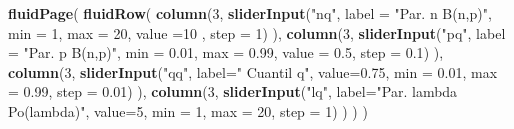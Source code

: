 \documentclass[]{book}
\newenvironment{Shaded}{\begin{snugshade}}{\end{snugshade}}
\newcommand{\DataTypeTok}[1]{\textcolor[rgb]{0.13,0.29,0.53}{#1}}
\newcommand{\DecValTok}[1]{\textcolor[rgb]{0.00,0.00,0.81}{#1}}
\newcommand{\FloatTok}[1]{\textcolor[rgb]{0.00,0.00,0.81}{#1}}
\newcommand{\KeywordTok}[1]{\textcolor[rgb]{0.13,0.29,0.53}{\textbf{#1}}}
\newcommand{\NormalTok}[1]{#1}
\newcommand{\StringTok}[1]{\textcolor[rgb]{0.31,0.60,0.02}{#1}}
\begin{document}
\begin{Shaded}
\begin{Highlighting}[]
\KeywordTok{fluidPage}\NormalTok{(}
\KeywordTok{fluidRow}\NormalTok{(}
  \KeywordTok{column}\NormalTok{(}\DecValTok{3}\NormalTok{,}
         \KeywordTok{sliderInput}\NormalTok{(}\StringTok{"nq"}\NormalTok{, }\DataTypeTok{label =} \StringTok{"Par. n B(n,p)"}\NormalTok{,}
              \DataTypeTok{min =} \DecValTok{1}\NormalTok{, }\DataTypeTok{max =} \DecValTok{20}\NormalTok{, }\DataTypeTok{value =}\DecValTok{10}\NormalTok{ , }\DataTypeTok{step =} \DecValTok{1}\NormalTok{)}
\NormalTok{         ),}
  \KeywordTok{column}\NormalTok{(}\DecValTok{3}\NormalTok{,}
          \KeywordTok{sliderInput}\NormalTok{(}\StringTok{"pq"}\NormalTok{, }\DataTypeTok{label =} \StringTok{"Par. p B(n,p)"}\NormalTok{,}
                     \DataTypeTok{min =} \FloatTok{0.01}\NormalTok{, }\DataTypeTok{max =} \FloatTok{0.99}\NormalTok{, }\DataTypeTok{value =} \FloatTok{0.5}\NormalTok{, }\DataTypeTok{step =} \FloatTok{0.1}\NormalTok{)}
\NormalTok{         ),}
  \KeywordTok{column}\NormalTok{(}\DecValTok{3}\NormalTok{,}
         \KeywordTok{sliderInput}\NormalTok{(}\StringTok{"qq"}\NormalTok{, }\DataTypeTok{label=}\StringTok{" Cuantil q"}\NormalTok{, }\DataTypeTok{value=}\FloatTok{0.75}\NormalTok{, }\DataTypeTok{min =} \FloatTok{0.01}\NormalTok{, }\DataTypeTok{max =} \FloatTok{0.99}\NormalTok{, }
                     \DataTypeTok{step =} \FloatTok{0.01}\NormalTok{)}
\NormalTok{         ),}
  \KeywordTok{column}\NormalTok{(}\DecValTok{3}\NormalTok{,}
         \KeywordTok{sliderInput}\NormalTok{(}\StringTok{"lq"}\NormalTok{, }\DataTypeTok{label=}\StringTok{"Par. lambda Po(lambda)"}\NormalTok{, }\DataTypeTok{value=}\DecValTok{5}\NormalTok{, }\DataTypeTok{min =} \DecValTok{1}\NormalTok{, }\DataTypeTok{max =} \DecValTok{20}\NormalTok{, }
                     \DataTypeTok{step =} \DecValTok{1}\NormalTok{)}
\NormalTok{         )}
\NormalTok{  )}
\NormalTok{)}


\end{Highlighting}
\end{Shaded}
\end{document}
